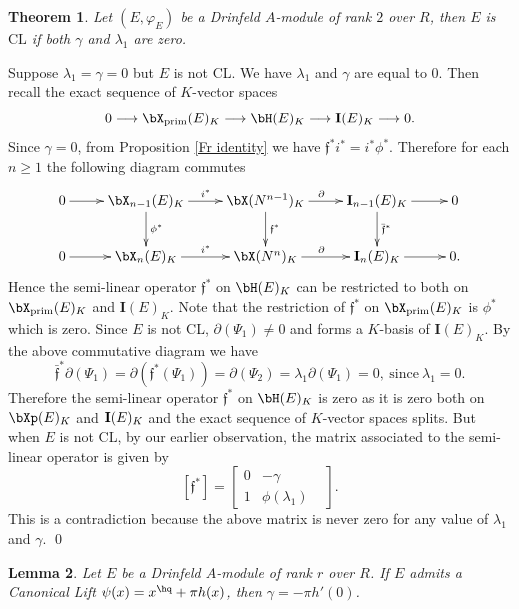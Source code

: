 \documentclass{amsart}
\newtheorem {theorem} {\bf{Theorem}}[section]
\newtheorem {lemma}[theorem] {\bf Lemma}
\numberwithin {equation}{section}
\newcommand{\bI}{{\bf I}}
\begin{document}
\begin{theorem}
Let $(E,\varphi_{E})$ be a Drinfeld $A$-module of rank $2$ over $R$, then $E$ is $\mathrm{CL}$ if  both $\gamma$ and $\lambda_{1}$ are zero.
\end{theorem}
\proof Suppose $\lambda_1 = \gamma = 0$ but $E$ is not CL. We have $\lambda_{1}$ and $\gamma$ are equal to $0$. Then recall the exact sequence of $K$-vector spaces 
$$ 0  \longrightarrow {\bX}_{\mathrm{prim}}(E)_{K}\longrightarrow {\bH}(E)_{K} \longrightarrow\mathbf{I}(E)_{K} \longrightarrow 0 .$$
Since $\gamma=0$, from Proposition \ref{Fr identity} we have $\mathfrak{f}^{*}i^{*}=i^{*}\phi^{*}$. Therefore for each $n\geq 1$ the following diagram commutes
$${
\xymatrix{
0  \ar[r] &{\bX}_{n-1}(E)_{K}\ar[d]^{\phi^{*}} \ar[r]^{i^{*}} &{\bX}(N^{n-1})_{K}\ar[d]^{\mathfrak{f}^{*}} \ar[r]^{\partial} &\mathbf{I}_{n-1}(E)_{K}\ar[d]^{\bar{\mathfrak{f}}^{*}} \ar[r]&0 \\
0 \ar[r] &{\bX}_{n}(E)_{K} \ar[r]^{i^{*}} &{\bX}(N^{n})_{K} \ar[r]^{\partial} &\mathbf{I}_{n}(E)_{K} \ar[r] &0.}}
$$
Hence the semi-linear operator $\mathfrak{f}^{*}$ on ${\bH}(E)_{K}$ can be restricted to both on   ${\bX}_{\mathrm{prim}}(E)_{K}$ and $\mathbf{I}(E)_{K}$. Note that the restriction of $\mathfrak{f}^{*}$ on ${\bX}_{\mathrm{prim}}(E)_{K}$ is $\phi^{*}$ which is zero. Since $E$ is not CL, $\partial(\Psi_{1})\neq 0$ and forms a $K$-basis of $\mathbf{I}(E)_{K} $. By the above commutative diagram  we have $$\bar{\mathfrak{f}}^{*}\partial(\Psi_{1})=\partial(\mathfrak{f}^{*}(\Psi_{1}))=\partial(\Psi_{2})=\lambda_{1}\partial(\Psi_{1})=0, \ \mathrm{since} \ \lambda_{1}=0 .$$ 
Therefore the semi-linear operator $\mathfrak{f}^{*}$ on ${\bH}(E)_{K}$ is zero as it is zero  both on $\bXp(E)_K$ and $\bI(E)_K$ and the exact sequence of $K$-vector spaces splits. But when $E$ is not CL, by our earlier observation,
 the matrix associated to the semi-linear operator is given by
\[
[\mathfrak{f}^{*}]=
\begin{bmatrix}
   0  & -\gamma  \\
    1 & \phi(\lambda_{1})& 
     
\end{bmatrix}.
\]
This is a contradiction because the above matrix is never zero for any value of $\lambda_{1}$ and $\gamma$.
\qed
 
 
\begin{lemma}\label{CL_gamma} 
Let $E$ be a  Drinfeld $A$-module of rank $r$ over $R$. If $E$ admits a Canonical Lift $\psi(x)=x^{\hq}+\pi h(x)$, then $\gamma=-\pi h'(0)$.
\end{lemma}
\end{document}
